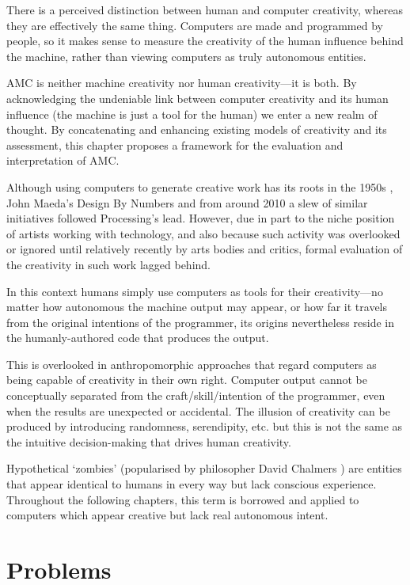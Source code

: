 There is a perceived distinction between human and computer creativity, whereas they are effectively the same thing. Computers are made and programmed by people, so it makes sense to measure the creativity of the human influence behind the machine, rather than viewing computers as truly autonomous entities.

\acf{AMC} is neither machine creativity nor human crea\-tivity---it is both. By acknowledging the undeniable link between computer creativity and its human influence (the machine is just a tool for the human) we enter a new realm of thought. By concatenating and enhancing existing models of creativity and its assessment, this chapter proposes a framework for the evaluation and interpretation of \ac{AMC}.

\spirals

Although using computers to generate creative work has its roots in the 1950s \autocite{Candy2011, Copeland2016}, John Maeda's Design By Numbers \autocite*{Maeda2001} and from around 2010 a slew of similar initiatives followed Processing's lead. However, due in part to the niche position of artists working with technology, and also because such activity was overlooked or ignored until relatively recently by arts bodies and critics, formal evaluation of the creativity in such work lagged behind.

In this context humans simply use computers as tools for their creativity---no matter how autonomous the machine output may appear, or how far it travels from the original intentions of the programmer, its origins nevertheless reside in the humanly-authored code that produces the output.

This is overlooked in anthropomorphic approaches that regard computers as being capable of creativity in their own right. Computer output cannot be conceptually separated from the craft/skill/intention of the programmer, even when the results are unexpected or accidental. The illusion of creativity can be produced by introducing randomness, serendipity, etc. but this is not the same as the intuitive decision-making that drives human creativity.

Hypothetical `zombies' (popularised by philosopher David Chalmers \autocite*{Chalmers1996}) are entities that appear identical to humans in every way but lack conscious experience. Throughout the following chapters, this term is borrowed and applied to computers which appear creative but lack real autonomous intent.


\section{Problems}


